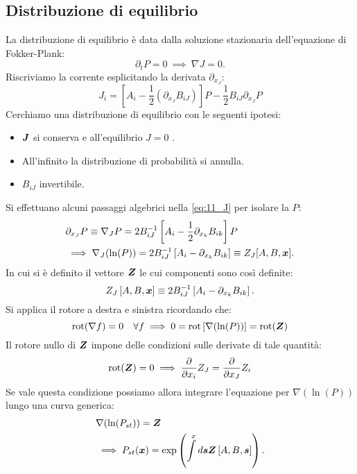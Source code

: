 \subsection{Distribuzione di equilibrio}%
\label{sub:Distribuzione di equilibrio del processo}
La distribuzione di equilibrio è data dalla soluzione stazionaria dell'equazione di Fokker-Plank:
\[
    \partial_t P = 0 \ \implies  \ \nabla J = 0
.\] 
Riscriviamo la corrente esplicitando la derivata $\partial_{x_J}$:
\begin{equation}
    J_i = \left[A_i-\frac{1}{2}\left(\partial_{x_J}B_{iJ}\right)\right]P - \frac{1}{2} B_{iJ}\partial_{x_J}P
    \label{eq:11_J}
\end{equation}
Cerchiamo una distribuzione di equilibrio con le seguenti ipotesi:
\begin{itemize}
    \item $\boldsymbol{J}$ si conserva e all'equilibrio $J=0$ .
    \item All'infinito la distribuzione di probabilità si annulla.
    \item $B_{iJ}$ invertibile.
\end{itemize}
Si effettuano alcuni passaggi algebrici nella \ref{eq:11_J} per isolare la $P$:
\begin{align}
    &\partial_{x_J}P \equiv \nabla_J P = 2B^{-1}_{iJ}\left[A_i-\frac{1}{2}\partial_{x_k}B_{ik}\right]P \label{eq:P_staz}\\
    &\implies
    \nabla_{J} (\ln (P)) = 2B_{iJ}^{-1}\left[A_i-\partial_{x_k}B_{ik}\right] \equiv Z_J[A, B, \boldsymbol{x}]
    \nonumber
.\end{align}
In cui si è definito il vettore $\boldsymbol{Z}$ le cui componenti sono così definite:
\[
    Z_J\left[A,B, \boldsymbol{x}\right] \equiv 2B_{iJ}^{-1}\left[A_i - \partial_{x_k}B_{ik}\right]
.\] 
Si applica il rotore a destra e sinistra ricordando che:
\[
    \text{rot}(\nabla f)  = 0 \quad \forall f \implies 
    0 = \mbox{rot}\left[\nabla (\ln (P))\right]  = \text{rot}(\boldsymbol{Z})
\]
Il rotore nullo di $\boldsymbol{Z}$ impone delle condizioni sulle derivate di tale quantità:
\begin{equation}
    \text{rot}(\boldsymbol{Z}) = 0 \implies  
     \frac{\partial }{\partial x_i} Z_J = \frac{\partial }{\partial x_J} Z_i  
    \label{eq:11_rot}
\end{equation}
Se vale questa condizione possiamo allora integrare l'equazione per $\nabla (\ln (P))$ lungo una curva generica:
\[\begin{aligned}
    &\nabla (\ln (P_{st})) = \boldsymbol{Z} \\
    & \implies  P_{st}(\boldsymbol{x}) = \exp\left(\int\limits^{x} d\boldsymbol{s}\boldsymbol{Z}\left[A,B, \boldsymbol{s}\right]\right)
.\end{aligned}\]
